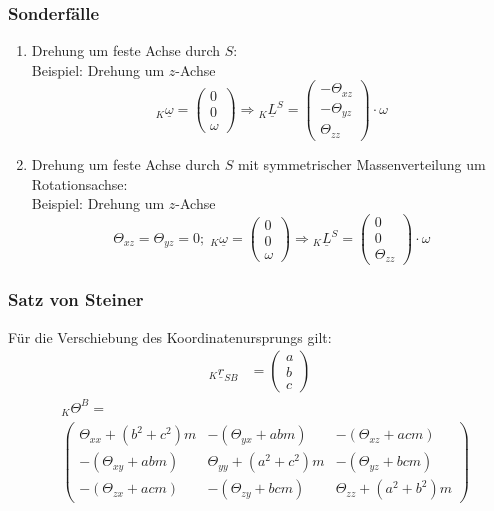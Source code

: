 \documentclass[a4paper,twocolumn,10pt]{article}
\begin{document}
\subsubsection{Sonderfälle}
\begin{enumerate}
\item Drehung um feste Achse durch $S$:\\
Beispiel: Drehung um $z$-Achse
\begin{equation*}
{}_K\underline{\omega}=\begin{pmatrix}0 \\ 0 \\ \omega\end{pmatrix}\Rightarrow {}_K\underline{L}^S=\begin{pmatrix}-\Theta_{xz} \\ -\Theta_{yz} \\ \Theta_{zz}\end{pmatrix}\cdot\omega
\end{equation*}
\item Drehung um feste Achse durch $S$ mit symmetrischer Massenverteilung um Rotationsachse:\\
Beispiel: Drehung um $z$-Achse
\begin{equation*}
\Theta_{xz}=\Theta_{yz}=0;\;{}_K\underline{\omega}=\begin{pmatrix}0 \\ 0 \\ \omega\end{pmatrix}\Rightarrow {}_K\underline{L}^S=\begin{pmatrix}0 \\ 0 \\ \Theta_{zz}\end{pmatrix}\cdot\omega
\end{equation*}
\end{enumerate}

\subsubsection{Satz von Steiner}
Für die Verschiebung des Koordinatenursprungs gilt:
\begin{equation*}
\begin{split}
{}_K\underline{r}_{SB}&=\begin{pmatrix}a \\ b \\ c\end{pmatrix}
\end{split}
\end{equation*}
\begin{equation*}
\begin{split}
&{}_K\Theta^B=\\
&\begin{pmatrix}\Theta_{xx}+(b^2+c^2)m & -(\Theta_{yx}+abm) & -(\Theta_{xz}+acm) \\ -(\Theta_{xy}+abm) & \Theta_{yy}+(a^2+c^2)m & -(\Theta_{yz}+bcm) \\ -(\Theta_{zx}+acm) & -(\Theta_{zy}+bcm) & \Theta_{zz}+(a^2+b^2)m\end{pmatrix}
\end{split}
\end{equation*}
\end{document}
